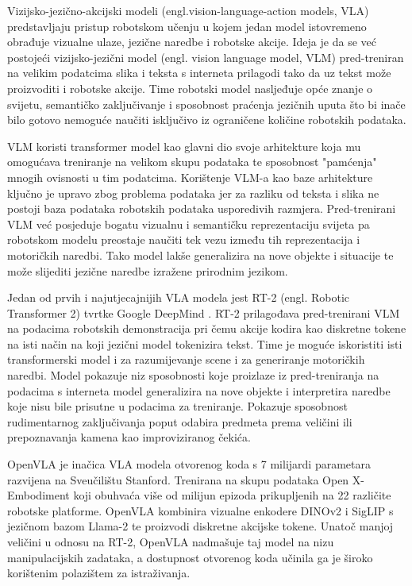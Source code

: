 \documentclass[times, utf8, diplomski]{fer}
\begin{document}
Vizijsko-jezično-akcijski modeli (engl.vision-language-action models, VLA) predstavljaju pristup robotskom učenju u kojem jedan model istovremeno obrađuje vizualne ulaze, jezične naredbe i robotske akcije. Ideja je da se već postojeći vizijsko-jezični model (engl. vision language model, VLM) pred-treniran na velikim podatcima slika i teksta s interneta prilagodi tako da uz tekst može proizvoditi i robotske akcije. Time robotski model nasljeđuje opće znanje o svijetu, semantičko zaključivanje i sposobnost praćenja jezičnih uputa što bi inače bilo gotovo nemoguće naučiti isključivo iz ograničene količine robotskih podataka.
 
VLM koristi transformer model kao glavni dio svoje arhitekture koja mu omogućava treniranje na velikom skupu podataka te sposobnost "pamćenja" mnogih ovisnosti u tim podatcima. Korištenje VLM-a kao baze arhitekture ključno je upravo zbog problema podataka jer za razliku od teksta i slika ne postoji baza podataka robotskih podataka usporedivih razmjera. Pred-trenirani VLM već posjeduje bogatu vizualnu i semantičku reprezentaciju svijeta pa robotskom modelu preostaje naučiti tek vezu između tih reprezentacija i motoričkih naredbi. Tako model lakše generalizira na nove objekte i situacije te može slijediti jezične naredbe izražene prirodnim jezikom.
 
Jedan od prvih i najutjecajnijih VLA modela jest RT-2 (engl. Robotic Transformer 2) tvrtke Google DeepMind \cite{zitkovich2023rt2}. RT-2 prilagođava pred-trenirani VLM na podacima robotskih demonstracija pri čemu akcije kodira kao diskretne tokene na isti način na koji jezični model tokenizira tekst. Time je moguće iskoristiti isti transformerski model i za razumijevanje scene i za generiranje motoričkih naredbi. Model pokazuje niz sposobnosti koje proizlaze iz pred-treniranja na podacima s interneta model generalizira na nove objekte i interpretira naredbe koje nisu bile prisutne u podacima za treniranje. Pokazuje sposobnost rudimentarnog zaključivanja poput odabira predmeta prema veličini ili prepoznavanja kamena kao improviziranog čekića.
 
OpenVLA \cite{kim2024openvla} je inačica VLA modela otvorenog koda s 7 milijardi parametara razvijena na Sveučilištu Stanford. Trenirana na skupu podataka Open X-Embodiment \cite{oneill2024openx} koji obuhvaća više od milijun epizoda prikupljenih na 22 različite robotske platforme. OpenVLA kombinira vizualne enkodere DINOv2 \cite{oquab2024dinov2} i SigLIP \cite{zhai2023sigmoidlosslanguageimage} s jezičnom bazom Llama-2 \cite{touvron2023llama2} te proizvodi diskretne akcijske tokene. Unatoč manjoj veličini u odnosu na RT-2, OpenVLA nadmašuje taj model na nizu manipulacijskih zadataka, a dostupnost otvorenog koda učinila ga je široko korištenim polazištem za istraživanja.
\end{document}
